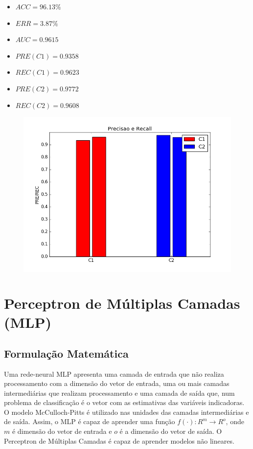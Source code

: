 \documentclass[11pt,a4paper]{article}
\numberwithin{equation}{section}
\begin{document}
\begin{minipage}{.5\textwidth}
\begin{itemize}
\item $ACC = 96.13 \%$
\item $ERR =  3.87 \% $
\item $AUC = 0.9615 $
\item $PRE(C1) = 0.9358$
\item $REC(C1) = 0.9623$
\item $PRE(C2) = 0.9772$
\item $REC(C2) = 0.9608$
\end{itemize}
\end{minipage}%
\begin{minipage}{.5\textwidth}
\begin{figure}[H]
\centering
  \includegraphics[width=\linewidth]{../img/perc_rec_std.png}
  \label{fig:percep}
\end{figure}
\end{minipage}


\section{Perceptron de Múltiplas Camadas (MLP)}
\subsection{Formulação Matemática}
Uma rede-neural MLP apresenta uma camada de entrada que não realiza processamento com a dimensão do vetor de entrada, uma ou mais camadas intermediárias que realizam processamento e uma camada de saída que, num problema de classificação é o vetor com as estimativas das variáveis indicadoras. O modelo McCulloch-Pitts é utilizado nas unidades das camadas intermediárias e de saída. Assim, o MLP é capaz de aprender uma função $f(\cdot): R^m \rightarrow R^o$, onde $m$ é dimensão do vetor de entrada e $o$ é a dimensão do vetor de saída. O Perceptron de Múltiplas Camadas é capaz de aprender modelos não lineares.
\end{document}
